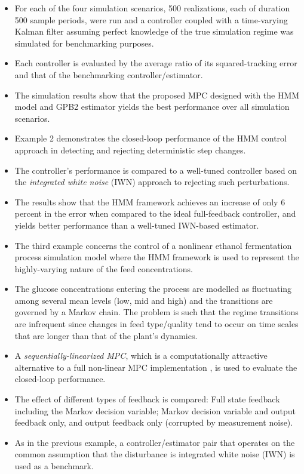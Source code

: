 \begin{itemize}
	\item For each of the four simulation scenarios, 500 realizations, each of duration 500 sample periods, were run and a controller coupled with a time-varying Kalman filter assuming perfect knowledge of the true simulation regime was simulated for benchmarking purposes.
	\item Each controller is evaluated by the average ratio of its squared-tracking error and that of the benchmarking controller/estimator.
	\item The simulation results show that the proposed MPC designed with the HMM model and GPB2 estimator yields the best performance over all simulation scenarios.
	\item Example 2 demonstrates the closed-loop performance of the HMM control approach in detecting and rejecting deterministic step changes.
	\item The controller's performance is compared to a well-tuned controller based on the \textit{integrated white noise} (IWN) approach to rejecting such perturbations.
	\item The results show that the HMM framework achieves an increase of only 6 percent in the error when compared to the ideal full-feedback controller, and yields better performance than a well-tuned IWN-based estimator.
	\item The third example concerns the control of a nonlinear ethanol fermentation process simulation model where the HMM framework is used to represent the highly-varying nature of the feed concentrations.
	\item The glucose concentrations entering the process are modelled as fluctuating among several mean levels (low, mid and high) and the transitions are governed by a Markov chain.  The problem is such that the regime transitions are infrequent since changes in feed type/quality tend to occur on time scales that are longer than that of the plant’s dynamics.
	\item A \textit{sequentially-linearized MPC}, which is a computationally attractive alternative to a full non-linear MPC implementation \cite{lee_extended_1994}, is used to evaluate the closed-loop performance.
	\item The effect of different types of feedback is compared: Full state feedback including the Markov decision variable; Markov decision variable and output feedback only, and output feedback only (corrupted by measurement noise).
	\item As in the previous example, a controller/estimator pair that operates on the common assumption that the disturbance is integrated white noise (IWN) is used as a benchmark.

\end{itemize}
